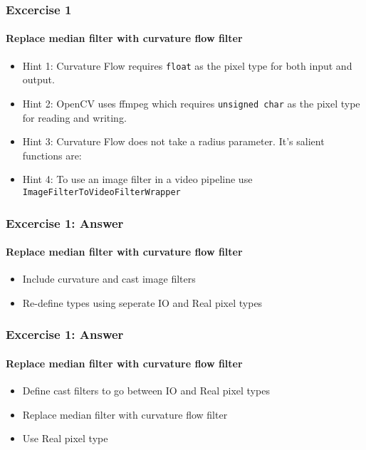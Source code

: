 {
\begin{frame}[fragile]
\frametitle{Excercise 1}
\framesubtitle{Replace median filter with curvature flow filter}
\begin{itemize}
\item Hint 1: Curvature Flow requires {\tt float} as the pixel
  type for both input and output.
\pause

\item Hint 2: OpenCV uses ffmpeg which requires {\tt unsigned char}
  as the pixel type for reading and writing.
\pause

\item Hint 3: Curvature Flow does not take a radius parameter. It's
  salient functions are:
\pause

\item Hint 4: To use an image filter in a video pipeline use
  {\tt ImageFilterToVideoFilterWrapper}
\end{itemize}
\end{frame}
}

{
\begin{frame}[fragile]
\frametitle{Excercise 1: Answer}
\framesubtitle{Replace median filter with curvature flow filter}
\begin{itemize}
\item Include curvature and cast image filters
\pause

\item Re-define types using seperate IO and Real pixel types
\end{itemize}
\end{frame}
}

{
\begin{frame}[fragile]
\frametitle{Excercise 1: Answer}
\framesubtitle{Replace median filter with curvature flow filter}
\begin{itemize}
\item Define cast filters to go between IO and Real pixel types
\pause

\item Replace median filter with curvature flow filter
\item Use Real pixel type
\end{itemize}
\end{frame}
}

